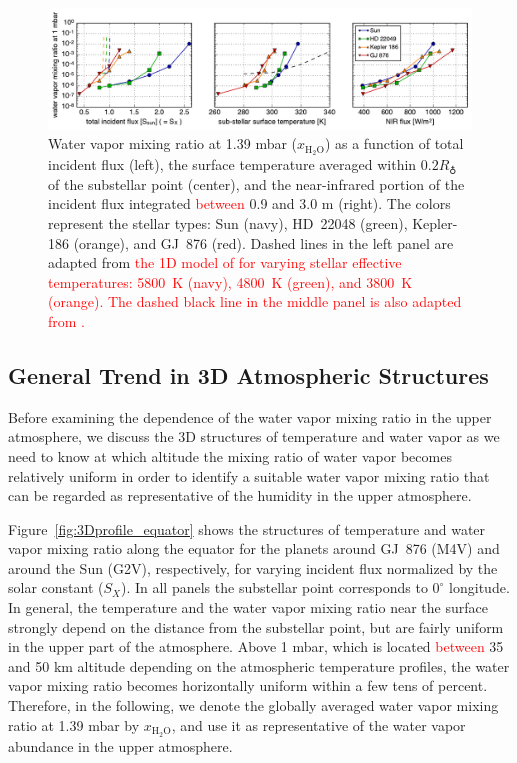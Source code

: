 \documentclass[11pt,numberedappendix,twocolappendix,]{emulateapj}
\def\water{H$_2$O}
\def\xwater{$x_\text{\water}$}
\def\preslevel{1.39 mbar}
\def\wv{water vapor}
\def\addYF#1{\textcolor{red}{#1}}
\begin{document}
\begin{figure}[t]
    \begin{center}
    \includegraphics[width=\hsize]{xH2O_3panels_ver2.pdf}
    \end{center}
\caption{Water vapor mixing ratio at \preslevel{} (\xwater{}) as a function of total incident flux (left), the surface temperature averaged within $0.2R_\earth$ of the substellar point (center), and the near-infrared portion of the incident flux integrated \addYF{between} 0.9 and 3.0 \textmu m (right). The colors represent the stellar types: Sun (navy), HD~22048 (green), Kepler-186 (orange), and GJ~876 (red). Dashed lines in the left panel are adapted from \addYF{the 1D model of \citet{Kopparapu2013} for varying stellar effective temperatures: 5800~K (navy), 4800~K (green), and 3800~K (orange). The dashed black line in the middle panel is also adapted from \citet{Kopparapu2013}. }}           
\label{fig:xH2O_S0X}
\end{figure}

\subsection{General Trend in 3D Atmospheric Structures}
\label{ss:result_H2Omixingratio}

Before examining the dependence of the \wv{} mixing ratio in the upper atmosphere, we discuss the 3D structures of temperature and water vapor as we need to know at which altitude the mixing ratio of \wv{} becomes relatively uniform in order to identify a suitable \wv{} mixing ratio that can be regarded as representative of the humidity in the upper atmosphere. 

Figure~\ref{fig:3Dprofile_equator} shows the structures of temperature and  \wv{} mixing ratio along the equator for the planets around GJ~876 (M4V) and around the Sun (G2V), respectively, for varying incident flux normalized by the solar constant ($S_X$). 
In all panels the substellar point corresponds to $0^{\circ }$ longitude. 
In general, the temperature and the \wv{} mixing ratio near the surface strongly depend on the distance from the substellar point, but are fairly uniform in the upper part of the atmosphere. 
Above 1 mbar, which is located \addYF{between} 35 and 50 km altitude depending on the atmospheric temperature profiles, the \wv{} mixing ratio becomes horizontally uniform within a few tens of percent. 
Therefore, in the following, we denote the globally averaged \wv{} mixing ratio at \preslevel{} by \xwater{}, and use it as representative of the \wv{} abundance in the upper atmosphere. 
\end{document}
